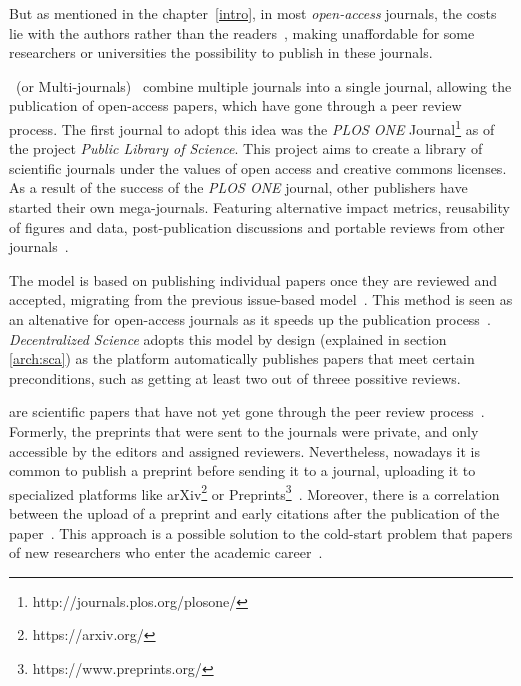 But as mentioned in the chapter~\ref{intro}, in most \emph{open-access}
journals, the costs lie with the authors rather than the
readers~\cite{lariviere2015oligopoly,van2013true}, making unaffordable for some
researchers or universities the possibility to publish in these journals.

~(or Multi-journals)~\cite{binfield2013open,wellen2013open}
combine multiple journals into a single journal, allowing the publication of
open-access papers, which have gone through a peer review process. The first
journal to adopt this idea was the \emph{PLOS ONE}
Journal\footnote{http://journals.plos.org/plosone/} as of the project
\emph{Public Library of Science}. This project aims to create a library of
scientific journals under the values of open access and creative commons
licenses. As a result of the success of the \emph{PLOS ONE} journal, other
publishers have started their own mega-journals. Featuring alternative impact
metrics, reusability of figures and data, post-publication discussions and
portable reviews from other journals~\cite{bjork2015have}.

The  model is based on publishing individual papers
once they are reviewed and accepted, migrating from the previous issue-based
model~\cite{anderton2013continuous}. This method is seen as an altenative for
open-access journals as it speeds up the publication process~\cite{haymanview}.
\emph{Decentralized Science} adopts this model by design (explained in section
\ref{arch:sca}) as the platform automatically publishes papers that meet certain
preconditions, such as getting at least two out of threee possitive reviews.

 are scientific papers that have not yet gone through the peer
review process~\cite{harnad2003electronic}. Formerly, the preprints that were
sent to the journals were private, and only accessible by the editors and
assigned reviewers. Nevertheless, nowadays it is common to publish a preprint
before sending it to a journal, uploading it to specialized platforms like
arXiv\footnote{https://arxiv.org/} or
Preprints\footnote{https://www.preprints.org/}~\cite{brown2001volution}.
Moreover, there is a correlation between the upload of a preprint and early
citations after the publication of the paper~\cite{shuai2012scientific}. This
approach is a possible solution to the cold-start problem that papers of new
researchers who enter the academic career~\cite{sugiyama2010scholarly}.

